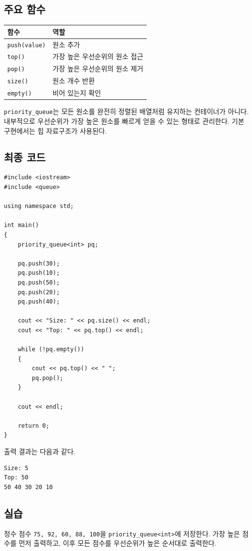 \documentclass[11pt,a4paper]{article}
\begin{document}
\subsection{주요 함수}
\begin{center}
\begin{tabular}{ll}
\toprule
함수 & 역할 \\
\midrule
\texttt{push(value)} & 원소 추가 \\
\texttt{top()} & 가장 높은 우선순위의 원소 접근 \\
\texttt{pop()} & 가장 높은 우선순위의 원소 제거 \\
\texttt{size()} & 원소 개수 반환 \\
\texttt{empty()} & 비어 있는지 확인 \\
\bottomrule
\end{tabular}
\end{center}

\texttt{priority\_queue}는 모든 원소를 완전히 정렬된 배열처럼 유지하는 컨테이너가 아니다.
내부적으로 우선순위가 가장 높은 원소를 빠르게 얻을 수 있는 형태로 관리한다.
기본 구현에서는 힙 자료구조가 사용된다.

\subsection{최종 코드}
\begin{lstlisting}
#include <iostream>
#include <queue>

using namespace std;

int main()
{
    priority_queue<int> pq;

    pq.push(30);
    pq.push(10);
    pq.push(50);
    pq.push(20);
    pq.push(40);

    cout << "Size: " << pq.size() << endl;
    cout << "Top: " << pq.top() << endl;

    while (!pq.empty())
    {
        cout << pq.top() << " ";
        pq.pop();
    }

    cout << endl;

    return 0;
}
\end{lstlisting}

출력 결과는 다음과 같다.

\begin{verbatim}
Size: 5
Top: 50
50 40 30 20 10
\end{verbatim}

\subsection{실습}
\begin{practicebox}
정수 점수 \texttt{75, 92, 60, 88, 100}을 \texttt{priority\_queue<int>}에 저장한다.
가장 높은 점수를 먼저 출력하고, 이후 모든 점수를 우선순위가 높은 순서대로 출력한다.
\end{practicebox}
\end{document}
